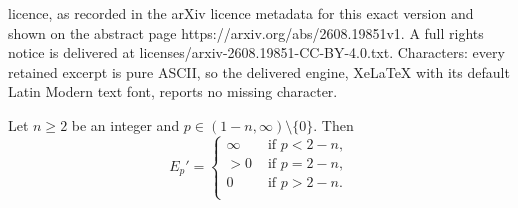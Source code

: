 \documentclass[10pt,a4paper]{amsart}
\begin{document}
licence, as recorded in the arXiv licence metadata for this exact version and shown on the abstract page https://arxiv.org/abs/2608.19851v1. A full rights notice is delivered at licenses/arxiv-2608.19851-CC-BY-4.0.txt. Characters: every retained excerpt is pure ASCII, so the delivered engine, XeLaTeX with its default Latin Modern text font, reports no missing character.
\begin{Lemma}\label{lemma:first variation of Ep}
Let $n\geq 2$ be an integer and $ p\in(1-n,\infty)\setminus\{0\}$. Then 
\begin{equation} \label{eq:thesis_first}
    E_p' =\begin{cases}
          \infty   & \text{ if } p<2-n, \\
      >0 & \text{ if } p = 2-n, \\
    0 & \text{ if } p>2-n. \\
      \end{cases}
\end{equation}
\end{Lemma}
\end{document}
